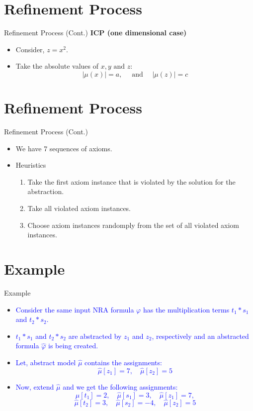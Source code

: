 \documentclass[]{beamer}
\begin{document}
\section{Refinement Process}
\begin{frame}{Refinement Process (Cont.)}
    \textbf{ICP (one dimensional case)}
   \begin{itemize}
   \item Consider, $z = x^2$.
   \item Take the absolute values of $x, y \text{ and } z$:
$$|\mu(x)| = a, \quad  \text{ and } \quad |\mu(z)| = c$$
\end{itemize}
\end{frame}

\section{Refinement Process}
\begin{frame}{Refinement Process (Cont.)}
    \begin{itemize}
        \item We have 7 sequences of axioms. 
        \item Heuristics
        \begin{enumerate}
            \item Take the first axiom instance that is violated by the solution for the abstraction.
            \item Take all violated axiom instances.
            \item Choose axiom instances randomply from the set of all violated axiom instances.
        \end{enumerate}
    \end{itemize}
\end{frame}

\section{Example}
\begin{frame}{Example}
    \begin{itemize}
        \item \textcolor<1>{blue}{Consider the same input NRA formula $\varphi$ has the multiplication terms $t_{1} \ast s_{1}$ and $t_{2} \ast s_{2}$.}
        \item \textcolor<2>{blue}{$t_{1} \ast s_{1}$ and $t_{2} \ast s_{2}$ are abstracted by $z_{1}$ and $z_{2}$, respectively and an abstracted formula $\hat{\varphi}$ is being created.}
		\item \textcolor<3>{blue}{Let, abstract model $\hat{\mu}$ contains the assignments:
    $$\hat{\mu}[z_{1}] = 7, \quad \hat{\mu}[z_{2}] = 5$$}
    \item \textcolor<4>{blue}{Now, extend $\hat{\mu}$ and we get the following assignments:
    $$\hat{\mu}[t_{1}] = 2, \quad \hat{\mu}[s_{1}] = 3, \quad \hat{\mu}[z_{1}] = 7,$$ $$\hat{\mu}[t_{2}] = 3, \quad \hat{\mu}[s_{2}] = -4, \quad \hat{\mu}[z_{2}] = 5$$}
    \end{itemize}
\end{frame}
\end{document}
